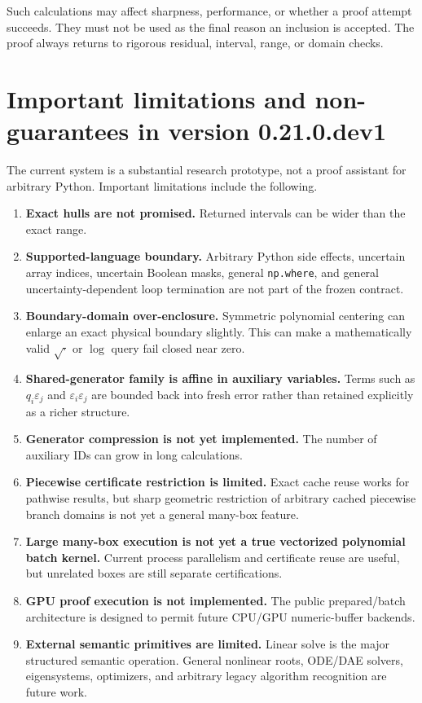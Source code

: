 \documentclass[11pt]{article}
\newcommand{\eps}{\varepsilon}
\begin{document}
Such calculations may affect sharpness, performance, or whether a proof attempt
succeeds.  They must not be used as the final reason an inclusion is accepted.
The proof always returns to rigorous residual, interval, range, or domain checks.

\section{Important limitations and non-guarantees in version 0.21.0.dev1}

The current system is a substantial research prototype, not a proof assistant for
arbitrary Python.  Important limitations include the following.

\begin{enumerate}[leftmargin=*]
\item \textbf{Exact hulls are not promised.}  Returned intervals can be wider
than the exact range.
\item \textbf{Supported-language boundary.}  Arbitrary Python side effects,
uncertain array indices, uncertain Boolean masks, general \texttt{np.where}, and
general uncertainty-dependent loop termination are not part of the frozen
contract.
\item \textbf{Boundary-domain over-enclosure.}  Symmetric polynomial centering
can enlarge an exact physical boundary slightly.  This can make a mathematically
valid \(\sqrt{\cdot}\) or \(\log\) query fail closed near zero.
\item \textbf{Shared-generator family is affine in auxiliary variables.}  Terms
such as \(q_i\eps_j\) and \(\eps_i\eps_j\) are bounded back into fresh error rather
than retained explicitly as a richer structure.
\item \textbf{Generator compression is not yet implemented.}  The number of
auxiliary IDs can grow in long calculations.
\item \textbf{Piecewise certificate restriction is limited.}  Exact cache reuse
works for pathwise results, but sharp geometric restriction of arbitrary cached
piecewise branch domains is not yet a general many-box feature.
\item \textbf{Large many-box execution is not yet a true vectorized polynomial
batch kernel.}  Current process parallelism and certificate reuse are useful, but
unrelated boxes are still separate certifications.
\item \textbf{GPU proof execution is not implemented.}  The public prepared/batch
architecture is designed to permit future CPU/GPU numeric-buffer backends.
\item \textbf{External semantic primitives are limited.}  Linear solve is the
major structured semantic operation.  General nonlinear roots, ODE/DAE solvers,
eigensystems, optimizers, and arbitrary legacy algorithm recognition are future
work.
\end{enumerate}
\end{document}
